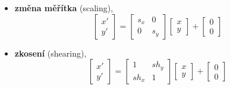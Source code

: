 \begin{itemize}
\begin{equation*}
          \end{equation*}
    \item \textbf{změna měřítka} (scaling),
          \begin{equation*}
              \begin{bmatrix}
                  x' \\[0.3em]
                  y'
              \end{bmatrix} =
              \begin{bmatrix}
                  s_x & 0   \\[0.3em]
                  0   & s_y
              \end{bmatrix}
              \begin{bmatrix}
                  x \\[0.3em]
                  y
              \end{bmatrix} +
              \begin{bmatrix}
                  0 \\[0.3em]
                  0
              \end{bmatrix}
          \end{equation*}
    \item \textbf{zkosení} (shearing),
          \begin{equation*}
              \begin{bmatrix}
                  x' \\[0.3em]
                  y'
              \end{bmatrix} =
              \begin{bmatrix}
                  1    & sh_y \\[0.3em]
                  sh_x & 1
              \end{bmatrix}
              \begin{bmatrix}
                  x \\[0.3em]
                  y
              \end{bmatrix} +
              \begin{bmatrix}
                  0 \\[0.3em]
                  0
              \end{bmatrix}
          \end{equation*}
\end{itemize}

